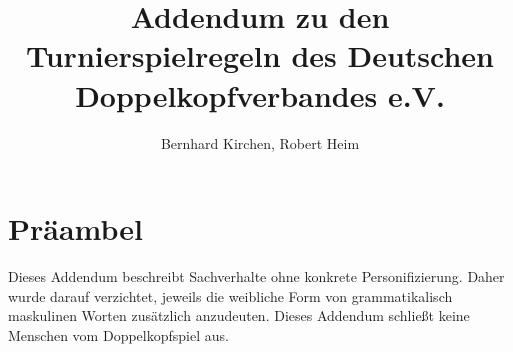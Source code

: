 \documentclass{article}
\begin{document}
\title{Addendum zu den Turnierspielregeln des Deutschen Doppelkopfverbandes e.V.}
\author{Bernhard Kirchen, Robert Heim}

\maketitle

\section*{Präambel}
Dieses Addendum beschreibt Sachverhalte ohne konkrete Personifizierung. Daher wurde
darauf verzichtet, jeweils die weibliche Form von grammatikalisch maskulinen Worten
zusätzlich anzudeuten. Dieses Addendum schließt keine Menschen vom Doppelkopfspiel
aus.


\end{document}
